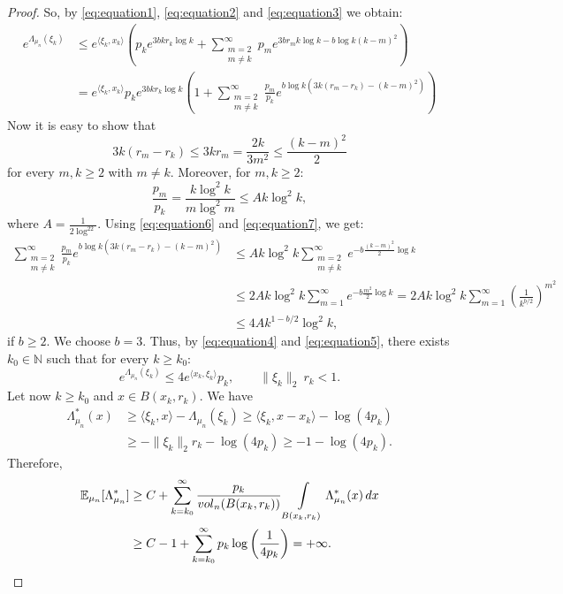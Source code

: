\documentclass[10pt,a4paper]{amsart}
\newcommand{\vol}{{\rm{vol}}}
\begin{document}
\begin{proof}
So, by \eqref{eq:equation1}, \eqref{eq:equation2} and \eqref{eq:equation3} we obtain:
\begin{equation}\label{eq:equation4}
\begin{aligned}e^{\Lambda_{\mu_n}(\xi_k)} &\leq e^{ \langle \xi_k, x_k \rangle} \left( p_k e^{3bk r_k \log k} + \sum\limits_{\substack{m=2 \\ m \neq k}}^{\infty} p_m e^{3br_mk \log k -b \log k (k-m)^2} \right)
\\ 
&= e^{ \langle \xi_k, x_k \rangle} p_k e^{3bk r_k \log k} \left(1+ \sum\limits_{\substack{m=2 \\ m \neq k}}^{\infty} \frac{p_m}{p_k} e^{b \log k (3k(r_m-r_k)-(k-m)^2)}\right)
\end{aligned}
\end{equation}
Now it is easy to show that 
\begin{equation}\label{eq:equation6}
3k(r_m-r_k) \leq 3kr_m =\frac{2k}{3m^2} \leq \frac{(k-m)^2}{2}
\end{equation}
for every $m,k \geq 2$ with $m \neq k$. Moreover, for $m,k \geq 2$: \begin{equation}\label{eq:equation7}
\frac{p_m}{p_k} = \frac{k \log^2k}{m \log^2 m} \leq A k \log^2 k,
\end{equation}
where $A=\frac{1}{2 \log^22}$. Using \eqref{eq:equation6} and \eqref{eq:equation7}, we get:
\begin{equation}\label{eq:equation5}
\begin{aligned} \sum\limits_{\substack{m=2 \\ m \neq k}}^{\infty} \frac{p_m}{p_k} e^{b \log k (3k(r_m-r_k)-(k-m)^2)} &\leq A k \log^2 k \sum\limits_{\substack{m=2 \\ m \neq k}}^{\infty} e^{-b  \frac{(k-m)^2}{2} \log k} 
\\
&\leq 2Ak \log^2 k \sum\limits_{m=1}^{\infty} e^{-b  \frac{m^2}{2} \log k } = 2Ak \log^2 k \sum\limits_{m=1}^{\infty} \left( \frac{1}{k^{b/2}}\right)^{m^2} 
\\
&\leq 4A k^{1-b/2} \log^2 k ,
\end{aligned}
\end{equation}
if $b \geq 2$.  We choose $b=3$. Thus, by \eqref{eq:equation4} and \eqref{eq:equation5}, there exists $k_0 \in \mathbb{N}$ such that for every $k \geq k_0$: $$e^{\Lambda_{\mu_n}(\xi_k)} \leq 4e^{\langle x_k , \xi_k \rangle}p_k, \qquad \|\xi_k\|_2 \ r_k<1.$$
Let now  $k \geq k_0$ and $x \in B(x_k,r_k)$. We have
\begin{align*}
   \Lambda_{\mu_n}^{\ast}(x) &\geq \langle \xi_k,x \rangle - \Lambda_{\mu_n}(\xi_k) \geq \langle \xi_k,x-x_k\rangle -\log (4p_k)  \\
&\geq -\|\xi_k\|_2r_k-\log(4p_k) \geq -1-\log(4p_k).
\end{align*}
Therefore, \begin{align*}\mathbb{E}_{\mu_n}[\Lambda_{\mu_n}^{\ast}] & \geq C+\sum\limits_{k=k_0}^{\infty} \frac{p_k}{\vol_n(B(x_k,r_k))} \int\limits_{B(x_k,r_k)} \Lambda_{\mu_n}^{\ast}(x) \, dx
\\
&\geq C-1+\sum\limits_{k=k_0}^{\infty} p_k \log\left(\frac{1}{4p_k}\right)=+\infty.
\end{align*}
\end{proof}
\end{document}
